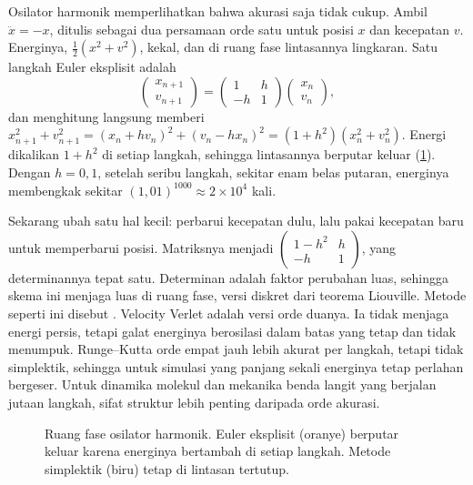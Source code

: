 Osilator harmonik memperlihatkan bahwa akurasi saja tidak cukup. Ambil $\ddot x=-x$, ditulis sebagai dua
persamaan orde satu untuk posisi $x$ dan kecepatan $v$. Energinya, $\tfrac12(x^2+v^2)$, kekal, dan di ruang fase
lintasannya lingkaran. Satu langkah Euler eksplisit adalah
\begin{equation}
\begin{pmatrix}x_{n+1}\\v_{n+1}\end{pmatrix}=\begin{pmatrix}1&h\\-h&1\end{pmatrix}\begin{pmatrix}x_n\\v_n\end{pmatrix},
\end{equation}
dan menghitung langsung memberi $x_{n+1}^2+v_{n+1}^2=(x_n+hv_n)^2+(v_n-hx_n)^2=(1+h^2)(x_n^2+v_n^2)$. Energi
dikalikan $1+h^2$ di setiap langkah, sehingga lintasannya berputar keluar (\cref{fig:faseruang}). Dengan
$h=0{,}1$, setelah seribu langkah, sekitar enam belas putaran, energinya membengkak sekitar $(1{,}01)^{1000}\approx2\times10^4$
kali.

Sekarang ubah satu hal kecil: perbarui kecepatan dulu, lalu pakai kecepatan baru untuk memperbarui posisi.
Matriksnya menjadi $\begin{pmatrix}1-h^2&h\\-h&1\end{pmatrix}$, yang determinannya tepat satu. Determinan
adalah faktor perubahan luas, sehingga skema ini menjaga luas di ruang fase, versi diskret dari teorema
Liouville. Metode seperti ini disebut . Velocity Verlet \citep{verlet1967} adalah versi orde
duanya. Ia tidak menjaga energi persis, tetapi galat energinya berosilasi dalam batas yang tetap dan tidak
menumpuk. Runge--Kutta orde empat jauh lebih akurat per langkah, tetapi tidak simplektik, sehingga untuk simulasi
yang panjang sekali energinya tetap perlahan bergeser. Untuk dinamika molekul dan mekanika benda langit yang
berjalan jutaan langkah, sifat struktur lebih penting daripada orde akurasi.

\begin{figure}[ht]
\centering
{}
\caption{Ruang fase osilator harmonik. Euler eksplisit (oranye) berputar keluar karena energinya bertambah di
setiap langkah. Metode simplektik (biru) tetap di lintasan tertutup.}
\label{fig:faseruang}
\end{figure}

